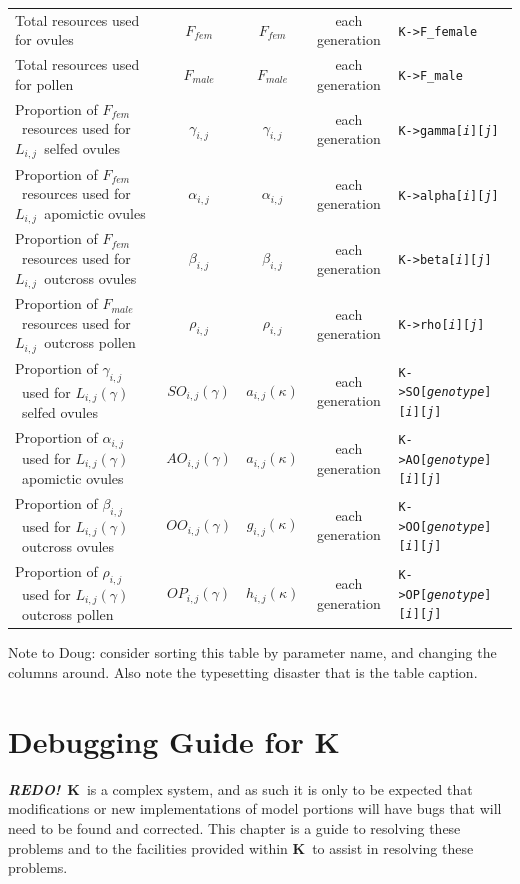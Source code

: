 \documentclass[12pt,twoside,letterpaper,fleqn]{report}
\numberwithin{equation}{section}  %
\newcommand{\REDO}{{\bf {\em REDO!}}}
\newcommand{\K}{{\bf K}}
\newcommand{\Kmember}[1]{\mbox{{\tt K->#1}}}
\newcommand{\Kmemberij}[3]{\mbox{{\tt K->#1[{\it #2}\/][{\it #3}\/]}}}
\newcommand{\Kmemberijk}[4]{\mbox{{\tt K->#1[{\it #2}\/][{\it #3}\/][{\it #4}\/]}}}
\newcommand{\Lij}{\mbox{$L_{i,j}$}}              %
\newcommand{\Lgij}{\mbox{$L_{i,j}(\gamma)$}}     %
\newcommand{\Ffemale}{\mbox{$F_{fem}$}}
\newcommand{\Fmale}{\mbox{$F_{male}$}}
\newcommand{\betaij}{\mbox{$\beta_{i,j}$}}
\newcommand{\gammaij}{\mbox{$\gamma_{i,j}$}}
\newcommand{\alphaij}{\mbox{$\alpha_{i,j}$}}
\newcommand{\rhoij}{\mbox{$\rho_{i,j}$}}
\newcommand{\SOijg}{\mbox{$SO_{i,j}(\gamma)$}}
\newcommand{\AOijg}{\mbox{$AO_{i,j}(\gamma)$}}
\newcommand{\OOijg}{\mbox{$OO_{i,j}(\gamma)$}}
\newcommand{\OPijg}{\mbox{$OP_{i,j}(\gamma)$}}
\begin{document}
{\begin{landscape}
\begin{longtable}{p{2in}|c|c|c|l}
Total resources used for ovules	& \Ffemale				&	\Ffemale			& each generation & \Kmember{F\_female} \\
Total resources used for pollen	& \Fmale					&	\Fmale				& each generation & \Kmember{F\_male} \\
Proportion of \Ffemale\ resources used for \Lij\ selfed ovules	&	\gammaij	&	\gammaij			& each generation & \Kmemberij{gamma}{i}{j} \\
Proportion of \Ffemale\ resources used for \Lij\ apomictic ovules	&	\alphaij	&	\alphaij	& each generation & \Kmemberij{alpha}{i}{j} \\
Proportion of \Ffemale\ resources used for \Lij\ outcross ovules	&	\betaij	&	\betaij				& each generation & \Kmemberij{beta}{i}{j} \\
Proportion of \Fmale\ resources used for \Lij\ outcross pollen	&	\rhoij	&	\rhoij				& each generation & \Kmemberij{rho}{i}{j} \\
Proportion of \gammaij\ used for \Lgij\ selfed ovules &	\SOijg	&	$a_{i,j}(\kappa)$\dag	& each generation & \Kmemberijk{SO}{genotype}{i}{j} \\
Proportion of \alphaij\ used for \Lgij\ apomictic ovules &	\AOijg	&	$a_{i,j}(\kappa)$\dag	& each generation & \Kmemberijk{AO}{genotype}{i}{j} \\
Proportion of \betaij\ used for \Lgij\ outcross ovules &	\OOijg	&	$g_{i,j}(\kappa)$	& each generation & \Kmemberijk{OO}{genotype}{i}{j} \\
Proportion of \rhoij\ used for \Lgij\ outcross pollen &	\OPijg	&	$h_{i,j}(\kappa)$	& each generation & \Kmemberijk{OP}{genotype}{i}{j} \\
\end{longtable}

\end{landscape}

Note to Doug: consider sorting this table by parameter name, and changing the columns around.  Also note the typesetting disaster that is the table caption.

\chapter{Debugging Guide for \K}

\REDO\  \K\ is a complex system, and as such it is only to be expected that
modifications or new implementations of model portions will have bugs that will
need to be found and corrected.  This chapter is a guide to resolving these
problems and to the facilities provided within \K\ to assist in resolving these
problems.

}
\end{document}
